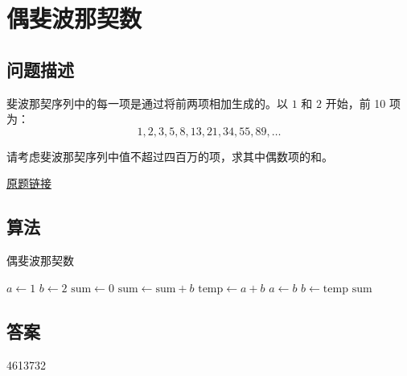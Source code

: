 \section{偶斐波那契数}
\subsection{问题描述}
\begin{tcolorbox}
	斐波那契序列中的每一项是通过将前两项相加生成的。以 $1$ 和 $2$ 开始，前 10 项为：
	$$1, 2, 3, 5, 8, 13, 21, 34, 55, 89, \dots$$

	请考虑斐波那契序列中值不超过四百万的项，求其中偶数项的和。

	\href{https://projecteuler.net/problem=2}{原题链接}
\end{tcolorbox}

\subsection{算法}
\begin{algorithm}
	\caption{偶斐波那契数}
	\begin{algorithmic}[1]
		\State \( a \gets 1 \)
		\State \(b \gets 2 \)
		\State \(\mathrm{sum} \gets 0 \)
		\State \( \mathrm{sum} \gets \mathrm{sum} + b \)
		\EndIf
		\State \( \mathrm{temp} \gets a + b \)
		\State \( a \gets b \)
		\State \( b \gets \mathrm{temp} \)
		\EndWhile
		\Return \( \mathrm{sum} \)
	\end{algorithmic}
\end{algorithm}

\subsection{答案}
4613732
